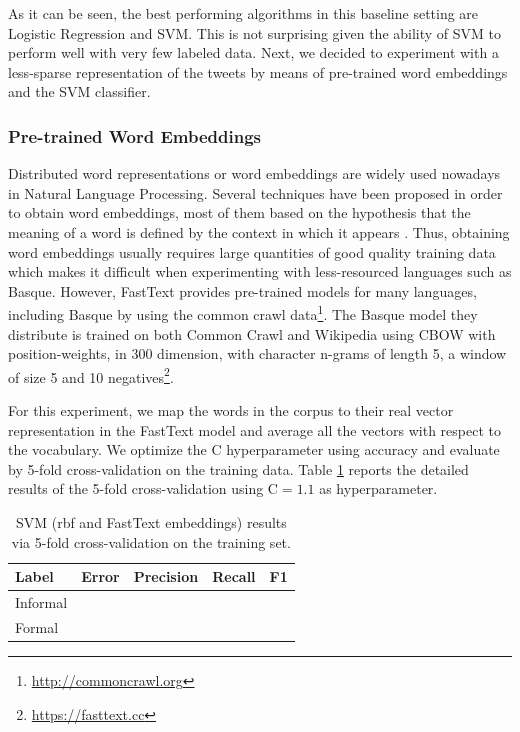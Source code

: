 \documentclass[information,article,submit,moreauthors,pdftex,10pt,a4paper]{Definitions/mdpi}
\begin{document}
As it can be seen, the best performing algorithms in this baseline setting are Logistic Regression and SVM. This is not surprising given the ability of SVM to perform well with very few labeled data. Next, we decided to experiment with a less-sparse representation of the tweets by means of pre-trained word embeddings and the SVM classifier.

\subsubsection{Pre-trained Word Embeddings}\label{sec:pre-trained-word}

Distributed word representations or word embeddings are widely used nowadays in Natural Language Processing. Several techniques have been proposed in order to obtain word embeddings, most of them based on the hypothesis that the meaning of a word is defined by the context in which it appears \cite{mikolov2013distributed,pennington-etal-2014-glove}. Thus, obtaining word embeddings usually requires large quantities of good quality training data which makes it difficult when experimenting with less-resourced languages such as Basque. However, FastText provides pre-trained models for many languages, including Basque \cite{mikolov-etal-2018-advances} by using the common crawl data\footnote{\url{http://commoncrawl.org}}. The Basque model they distribute is trained on both Common Crawl and Wikipedia using CBOW with position-weights, in 300 dimension, with character n-grams of length 5, a window of size 5 and 10 negatives\footnote{\url{https://fasttext.cc}}.

For this experiment, we map the words in the corpus to their real vector representation in the FastText model and average all the vectors with respect to the vocabulary. We optimize the C hyperparameter using accuracy and evaluate by 5-fold cross-validation on the training data. Table \ref{tab:svmf1} reports the detailed results of the 5-fold cross-validation using C$=1.1$ as hyperparameter.

\begin{table}[H]
  \centering
  \begin{tabular}{lcccc}
    \hline
    Label & Error & Precision & Recall & F1 \\ \hline \hline
    Informal & &  &   &  \\
    Formal &  &  &  &  \\ \hline
  \end{tabular}
  \caption{SVM (rbf and FastText embeddings) results via 5-fold cross-validation on the training set.}
  \label{tab:svmf1}
\end{table}
\end{document}

